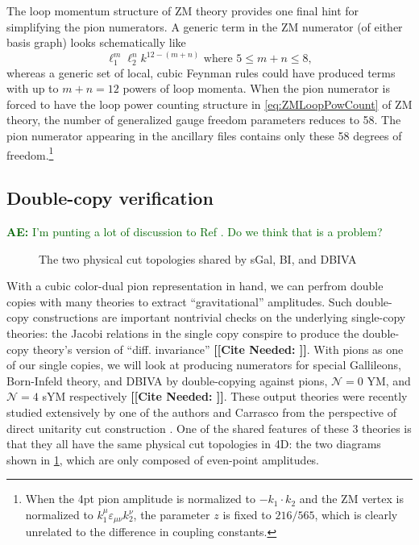 \documentclass[11pt,letter]{article}
\newcommand{\ace}[1]{\textcolor{darkgreen}{\textbf{AE:}{ #1}}}
\def\be{\begin{equation}}
\def\ee{\end{equation}}
\newcommand{\citepls}[1]{{\bf\color{red}[[Cite Needed: #1]]}}
\begin{document}
The loop momentum structure of ZM theory provides one final hint for simplifying the pion numerators.
A generic term in the ZM numerator (of either basis graph) looks schematically like
\be
\label{eq:ZMLoopPowCount}
\ell_1^m \ell_2^n k^{12-(m+n)} \text{ where } 5 \leq m+n \leq 8,
\ee
whereas a generic set of local, cubic Feynman rules could have produced terms with up to $m+n=12$ powers of loop momenta.
When the pion numerator is forced to have the loop power counting structure in \cref{eq:ZMLoopPowCount} of ZM theory, the number of generalized gauge freedom parameters reduces to 58.
The pion numerator appearing in the ancillary files contains only these 58 degrees of freedom.\footnote{When the 4pt pion amplitude is normalized to $-k_1\cdot k_2$ and the ZM vertex is normalized to $k_1^\mu \varepsilon_{\mu\nu}k_2^\nu$, the parameter $z$ is fixed to $216/565$, which is clearly unrelated to the difference in coupling constants.}

\subsection{Double-copy verification}
\ace{I'm punting a lot of discussion to Ref \cite{Carrasco:2023qgz}.
  Do we think that is a problem?}

\begin{figure}
  \begin{center}
	\PhysicalCutOne{}{}{}{} \PhysicalCutTwo{}{}{}{}
  \end{center}
  \caption{The two physical cut topologies shared by sGal, BI, and DBIVA}
  \label{fig:emu}
\end{figure}

With a cubic color-dual pion representation in hand, we can perfrom
double copies with many theories to extract ``gravitational''
amplitudes.  Such double-copy constructions are important nontrivial
checks on the underlying single-copy theories: the Jacobi relations in
the single copy conspire to produce the double-copy theory's version
of ``diff. invariance'' \citepls{}.  With pions as one of our single
copies, we will look at producing numerators for special Gallileons,
Born-Infeld theory, and DBIVA by double-copying against pions,
$\mathcal{N}=0$ YM, and $\mathcal{N}=4$ sYM respectively \citepls{}.
These output theories were recently studied extensively by one of the
authors and Carrasco from the perspective of direct unitarity cut
construction \cite{Carrasco:2023qgz}.  One of the shared features of
these 3 theories is that they all have the same physical cut
topologies in 4D: the two diagrams shown in \cref{fig:emu}, which are
only composed of even-point amplitudes.
\end{document}
